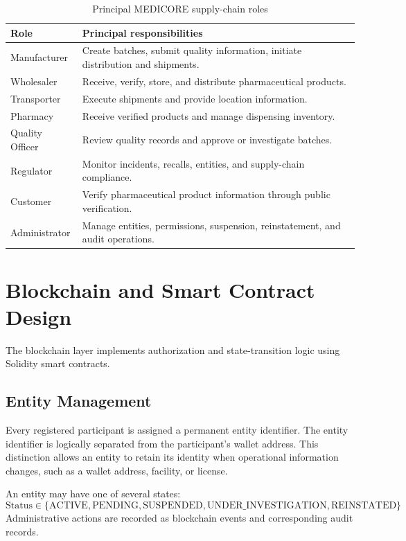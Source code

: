 \documentclass[11pt,a4paper]{article}
\begin{document}
\begin{table}[htbp]
\centering
\caption{Principal MEDICORE supply-chain roles}
\label{tab:roles}
\vspace{0.5em}
\begin{tabularx}{\textwidth}{lX}
\toprule
\textbf{Role} & \textbf{Principal responsibilities} \\
\midrule
Manufacturer & Create batches, submit quality information, initiate distribution and shipments. \\
Wholesaler & Receive, verify, store, and distribute pharmaceutical products. \\
Transporter & Execute shipments and provide location information. \\
Pharmacy & Receive verified products and manage dispensing inventory. \\
Quality Officer & Review quality records and approve or investigate batches. \\
Regulator & Monitor incidents, recalls, entities, and supply-chain compliance. \\
Customer & Verify pharmaceutical product information through public verification. \\
Administrator & Manage entities, permissions, suspension, reinstatement, and audit operations. \\
\bottomrule
\end{tabularx}
\end{table}

\section{Blockchain and Smart Contract Design}
The blockchain layer implements authorization and state-transition logic using Solidity smart contracts.

\subsection{Entity Management}
Every registered participant is assigned a permanent entity identifier. The entity identifier is logically separated from the participant's wallet address. This distinction allows an entity to retain its identity when operational information changes, such as a wallet address, facility, or license.

An entity may have one of several states:
\begin{equation}
\text{Status} \in \{\text{ACTIVE}, \text{PENDING}, \text{SUSPENDED}, \text{UNDER\_INVESTIGATION}, \text{REINSTATED}\}
\end{equation}
Administrative actions are recorded as blockchain events and corresponding audit records.
\end{document}
